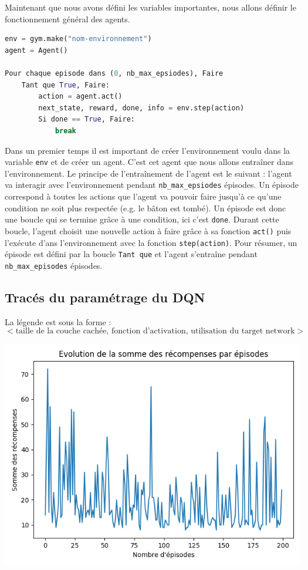 \documentclass[10pt,a4paper]{article}
\begin{document}
Maintenant que nous avons défini les variables importantes, nous allons définir le fonctionnement général des agents.

\begin{lstlisting}[language=Python, caption=Pseudo-code du fonctionnement de l'agent dans son environnement]
env = gym.make("nom-environnement")
agent = Agent()

Pour chaque episode dans (0, nb_max_epsiodes), Faire
    Tant que True, Faire:
        action = agent.act()
        next_state, reward, done, info = env.step(action)
        Si done == True, Faire:
            break
\end{lstlisting}

Dans un premier temps il est important de créer l'environnement voulu dans la variable \lstinline{env} et de créer un agent. C'est cet agent que nous allons entraîner dans l'environnement.
Le principe de l'entraînement de l'agent est le suivant : l'agent va interagir avec l'environnement pendant \lstinline{nb_max_epsiodes} épisodes. Un épisode correspond à toutes les actions que l'agent va pouvoir faire jusqu'à ce qu'une condition ne soit plus respectée (e.g. le bâton est tombé). Un épisode est donc une boucle qui se termine grâce à une condition, ici c'est \lstinline{done}. Durant cette boucle, l'agent choisit une nouvelle action à faire grâce à sa fonction \lstinline{act()} puis l'exécute d'ans l'environnement avec la fonction \lstinline{step(action)}. Pour résumer, un épisode est défini par la boucle \lstinline{Tant que} et l'agent s'entraîne pendant \lstinline{nb_max_episodes} épisodes.

\subsection{Tracés du paramétrage du DQN} \label{graphDQN}

La légende est sous la forme :
$$ < \text{taille de la couche cachée, fonction d'activation, utilisation du target network} >$$

\begin{center}
	\includegraphics[scale=0.3]{../performances/tarnetRelu24.png}
\end{center}
\end{document}
